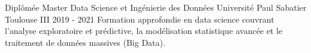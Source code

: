 


\begin{cventries}


\cventry
{Diplômée} %
{Master Data Science et Ingénierie des Données} %
{Université Paul Sabatier Toulouse III} %
{2019 - 2021} %
{Formation approfondie en data science couvrant l'analyse exploratoire et prédictive, la modélisation statistique avancée et le traitement de données massives (Big Data).} %


\end{cventries}